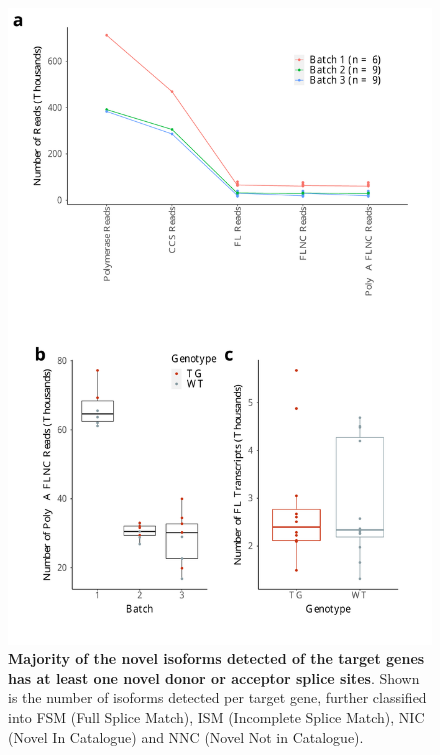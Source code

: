 \begin{figure}[!htp]
	\begin{center}
		\includegraphics[page=4,scale = 0.55]{Figures/TargetedTranscriptome.pdf}
	\end{center}
	\captionsetup{width=0.95\textwidth}
	\caption[Classification of novel and known isoforms from Targeted Sequencing in mouse cortex]%
	{\textbf{Majority of the novel isoforms detected of the target genes has at least one novel donor or acceptor splice sites}. Shown is the number of isoforms detected per target gene, further classified into FSM (Full Splice Match), ISM (Incomplete Splice Match), NIC (Novel In Catalogue) and NNC (Novel Not in Catalogue).}
	\label{fig:isoseq_targeted_finalnumberiso_sub}
\end{figure}

